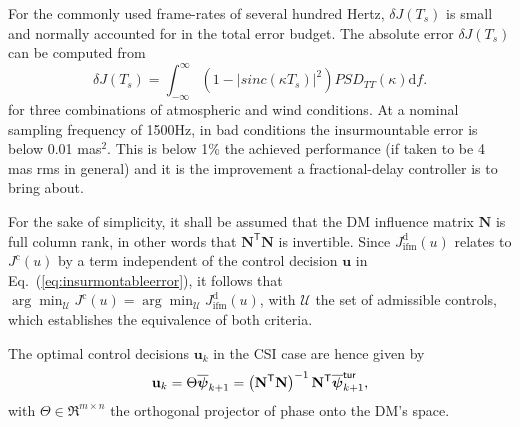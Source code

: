 \documentclass[a4paper,12pt]{article}
\newcommand{\T}{\mathsf{T}} %
\newcommand{\0}{\mathsf{0}} %
\newcommand{\N}{\mathbf{N}} %
\newcommand{\tur}{\mathsf{\tiny{tur}}}
\newcommand{\dint}{\mathrm{d}} %
\newcommand{\phivec}{{\boldsymbol{\psi}}}
\newcommand{\uvec}{{\mathbf{u}}}
\begin{document}
For the commonly used frame-rates of several hundred Hertz,
        $\delta J({T_s})$ is small and normally accounted for in the total
        error budget. %
        The absolute error $ \delta J\left(   T_s\right)$ can be computed from
\begin{equation}\label{eq:unsurmountable_error}
          \delta J\left(   T_s\right)  = \int_{-\infty}^\infty
          \left(1 - |sinc(\kappa T_s)|^2\right) PSD_{TT}(\kappa) \dint f.
        \end{equation}
for three combinations of atmospheric and wind conditions. At a
nominal sampling frequency of 1500Hz, in bad conditions the
insurmountable error is below 0.01 mas$^2$. This is below 1\% the
achieved performance (if taken to be 4 mas rms in general) and it is
the improvement a fractional-delay controller is to  bring about.



        For the sake of simplicity, it shall be assumed that the DM
        influence matrix $\N$ 
        is full column rank, in other words that $\N^{\T}\N$ is invertible.
        Since $J_\text{ifm}^\mathrm{d}(u)$  relates to
        $J^\mathrm{c}(u)$ by a term independent of the control decision $\uvec$ in
        Eq.~(\ref{eq:insurmontableerror}), 
        it follows that $\arg\min_{\mathcal{U}}
        J^{\mathrm{c}}\left(  u\right)  =\arg\min_{\mathcal{U}}
        J_\text{ifm}^{\mathrm{d}}\left(  u\right)$, with $\mathcal{U}$ the
        set of admissible controls, which establishes the
        equivalence of both criteria.  
        
        The optimal control decisions $\uvec_k$ in the CSI case are hence
        given by 
	\begin{equation}\label{eq:CSIcontrol_from_simple_projection}
          \uvec_k = \Theta \overline\phivec_{k+1} = \left(\N^{\T}\N\right)^{-1}\N^{\T}\overline\phivec_{k+1}^\tur,
	\end{equation}
	with $\Theta \in \Re^{m\times n}$ the orthogonal
        projector of phase onto the DM's space.
        
\end{document}
